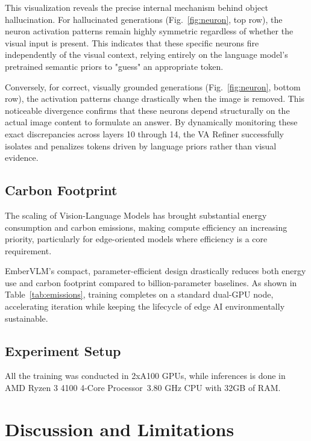 \documentclass[runningheads]{llncs}
\begin{document}
This visualization reveals the precise internal mechanism behind object hallucination. For hallucinated generations (Fig.~\ref{fig:neuron}, top row), the neuron activation patterns remain highly symmetric regardless of whether the visual input is present. This indicates that these specific neurons fire independently of the visual context, relying entirely on the language model's pretrained semantic priors to "guess" an appropriate token. 

Conversely, for correct, visually grounded generations (Fig.~\ref{fig:neuron}, bottom row), the activation patterns change drastically when the image is removed. This noticeable divergence confirms that these neurons depend structurally on the actual image content to formulate an answer. By dynamically monitoring these exact discrepancies across layers 10 through 14, the VA Refiner successfully isolates and penalizes tokens driven by language priors rather than visual evidence.

\subsection{Carbon Footprint}
\label{sec:emissions}

The scaling of Vision-Language Models has brought substantial energy consumption
and carbon emissions, making compute efficiency an increasing priority, particularly
for edge-oriented models where efficiency is a core requirement.

EmberVLM's compact, parameter-efficient design drastically reduces both energy use
and carbon footprint compared to billion-parameter baselines. As shown in
Table~\ref{tab:emissions}, training completes on a standard dual-GPU node,
accelerating iteration while keeping the lifecycle of edge AI environmentally
sustainable.

\subsection{Experiment Setup}

All the training was conducted in 2xA100 GPUs, while inferences is done in AMD Ryzen 3 4100 4-Core Processor 3.80 GHz CPU with 32GB of RAM. 


\section{Discussion and Limitations}
\label{sec:discussion}
\end{document}
